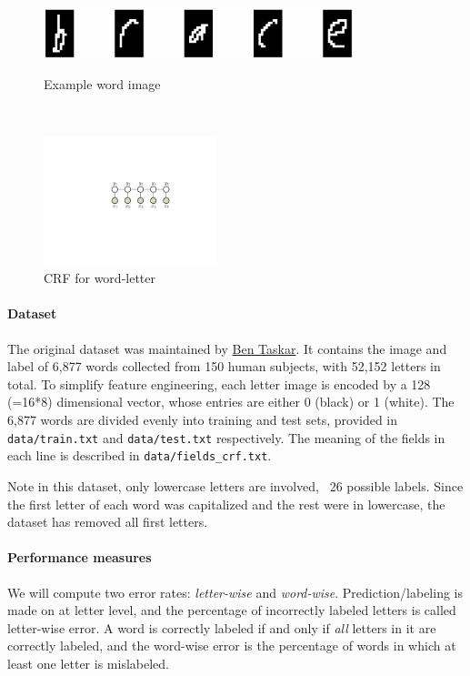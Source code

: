 \documentclass[11pt]{report}
\begin{document}
\begin{figure}[t!]
	\begin{minipage}[b]{0.62\textwidth}
		\centering
		\vspace{-0.6em}
		\includegraphics[width=9cm]{brace.jpg}
		\vspace{0.6em}
		\caption{Example word image}\label{fig:brace}
	\end{minipage}
	~~~
	\begin{minipage}[b]{0.33\textwidth}
		\centering
		\includegraphics[width=5cm]{crf}
		\caption{CRF for word-letter}\label{fig:CRF_model}
	\end{minipage}
\end{figure}



\paragraph{Dataset}
The original dataset was maintained by \href{https://en.wikipedia.org/wiki/Ben_Taskar}{Ben Taskar}.
It contains the image and label of 6,877 words collected from 150 human subjects,
with 52,152 letters in total.
To simplify feature engineering, each letter image is encoded by a 128 (=16*8) dimensional vector,
whose entries are either 0 (black) or 1 (white).
The 6,877 words are divided evenly into training and test sets,
provided in \verb#data/train.txt# and \verb#data/test.txt# respectively.
The meaning of the fields in each line is described in \verb#data/fields_crf.txt#.


Note in this dataset, only lowercase letters are involved, \ie\ 26 possible labels.
Since the first letter of each word was capitalized and the rest were in lowercase,
the dataset has removed all first letters.


\paragraph{Performance measures}
%
We will compute two error rates: \emph{letter-wise} and \emph{word-wise}.
Prediction/labeling is made on at letter level,
and the percentage of incorrectly labeled letters is called letter-wise error.
A word is correctly labeled if and only if \emph{all} letters in it are correctly labeled,
and the word-wise error is the percentage of words in which at least one letter is mislabeled.
\end{document}
